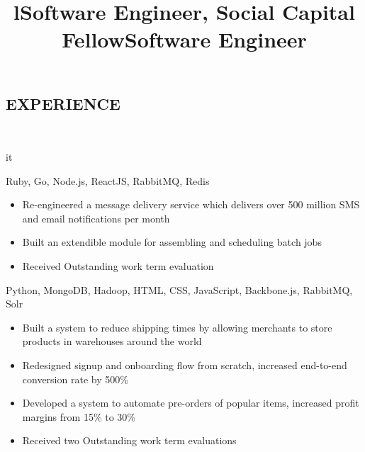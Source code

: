 \documentclass[]{res}
\begin{document}
\begin{resume}
\section{EXPERIENCE}
  \begin{format}  \\ \title{l}{it} \\ \body \end{format}
  \title{Software Engineer, Social Capital Fellow}
  \begin{position}
    \begin{description}
      \item Ruby, Go, Node.js, ReactJS, RabbitMQ, Redis
    \end{description}
    \begin{itemize}
      \item Re-engineered a message delivery service which delivers over 500 million
        SMS and email notifications per month
      \item Built an extendible module for assembling and scheduling batch jobs
      \item Received Outstanding work term evaluation
    \end{itemize}
  \end{position}
  \title{Software Engineer}
  \begin{position}
    \begin{description}
      \item Python, MongoDB, Hadoop, HTML, CSS, JavaScript, Backbone.js, RabbitMQ, Solr
    \end{description}
    \begin{itemize}
      \item Built a system to reduce shipping times by allowing merchants to store products in warehouses
        around the world
      \item Redesigned signup and onboarding flow from scratch, increased end-to-end conversion rate by 500\%
      \item Developed a system to automate pre-orders of popular items, increased profit margins from 15\% to 30\%
      \item Received two Outstanding work term evaluations
    \end{itemize}
  \end{position}

\end{resume}
\end{document}
